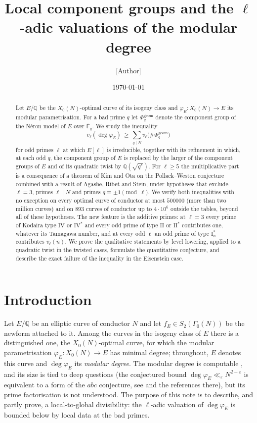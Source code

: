 \documentclass[11pt]{amsart}
\title{Local component groups and the $\ell$-adic valuations of the modular degree}
\author{[Author]}
\date{\today}
\theoremstyle{definition}
\newcommand{\Q}{\mathbb{Q}}
\newcommand{\F}{\mathbb{F}}
\newcommand{\degphi}{\deg\varphi_E}
\newcommand{\Phig}{\Phi^{\mathrm{geom}}}
\begin{document}
\begin{abstract}
Let $E/\Q$ be the $X_0(N)$-optimal curve of its isogeny class and $\varphi_E\colon X_0(N)\to E$ its modular parametrisation. For a bad prime $q$ let $\Phig_q$ denote the component group of the N\'eron model of $E$ over $\overline{\F}_q$. We study the inequality
\[
v_\ell(\degphi)\ \ge\ \sum_{q\mid N} v_\ell\bigl(\#\Phig_q\bigr)
\]
for odd primes $\ell$ at which $E[\ell]$ is irreducible, together with its refinement in which, at each odd $q$, the component group of $E$ is replaced by the larger of the component groups of $E$ and of its quadratic twist by $\Q(\sqrt{q^*})$. For $\ell\ge 5$ the multiplicative part is a consequence of a theorem of Kim and Ota on the Pollack--Weston conjecture combined with a result of Agashe, Ribet and Stein, under hypotheses that exclude $\ell=3$, primes $\ell\mid N$ and primes $q\equiv\pm1\pmod\ell$. We verify both inequalities with no exception on every optimal curve of conductor at most $500000$ (more than two million curves) and on $893$ curves of conductor up to $4\cdot 10^6$ outside the tables, beyond all of these hypotheses. The new feature is the additive primes: at $\ell=3$ every prime of Kodaira type $\mathrm{IV}$ or $\mathrm{IV}^*$ and every odd prime of type $\mathrm{II}$ or $\mathrm{II}^*$ contributes one, whatever its Tamagawa number, and at every odd $\ell$ an odd prime of type $\mathrm{I}_n^*$ contributes $v_\ell(n)$. We prove the qualitative statements by level lowering, applied to a quadratic twist in the twisted cases, formulate the quantitative conjecture, and describe the exact failure of the inequality in the Eisenstein case.
\end{abstract}

\maketitle

\section{Introduction}

Let $E/\Q$ be an elliptic curve of conductor $N$ and let $f_E\in S_2(\Gamma_0(N))$ be the newform attached to it. Among the curves in the isogeny class of $E$ there is a distinguished one, the $X_0(N)$-optimal curve, for which the modular parametrisation $\varphi_E\colon X_0(N)\to E$ has minimal degree; throughout, $E$ denotes this curve and $\degphi$ its \emph{modular degree}. The modular degree is computable \cite{Cremona97,Watkins02}, and its size is tied to deep questions (the conjectured bound $\degphi\ll_\varepsilon N^{2+\varepsilon}$ is equivalent to a form of the $abc$ conjecture, see \cite[\S2]{ARS12} and the references there), but its prime factorisation is not understood. The purpose of this note is to describe, and partly prove, a local-to-global divisibility: the $\ell$-adic valuation of $\degphi$ is bounded below by local data at the bad primes.
\end{document}
